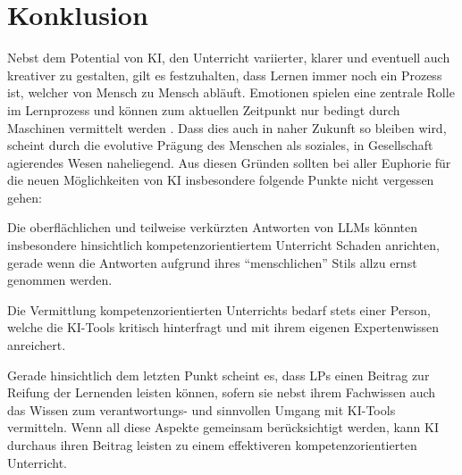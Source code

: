 \section{Konklusion}
Nebst dem Potential von \gls{KI}, den Unterricht variierter, klarer und eventuell auch kreativer zu gestalten, gilt es festzuhalten, dass Lernen immer noch ein Prozess ist, welcher von Mensch zu Mensch abläuft. Emotionen spielen eine zentrale Rolle im Lernprozess und können zum aktuellen Zeitpunkt nur bedingt durch Maschinen vermittelt werden \cite{nzzfolio}. Dass dies auch in naher Zukunft so bleiben wird, scheint durch die evolutive Prägung des Menschen als soziales, in Gesellschaft agierendes Wesen naheliegend. Aus diesen Gründen sollten bei aller Euphorie für die neuen Möglichkeiten von \gls{KI} insbesondere folgende Punkte nicht vergessen gehen: \begin{enumerate*}\item Die oberflächlichen und teilweise verkürzten Antworten von \glspl{LLM} könnten insbesondere hinsichtlich kompetenzorientiertem Unterricht Schaden anrichten, gerade wenn die Antworten aufgrund ihres ``menschlichen'' Stils allzu ernst genommen werden. \item Die Vermittlung kompetenzorientierten Unterrichts bedarf stets einer Person, welche die \gls{KI}-Tools kritisch hinterfragt und mit ihrem eigenen Expertenwissen anreichert.
\end{enumerate*} Gerade hinsichtlich dem letzten Punkt scheint es, dass \glspl{LP} einen Beitrag zur Reifung der Lernenden leisten können, sofern sie nebst ihrem Fachwissen auch das Wissen zum verantwortungs- und sinnvollen Umgang mit \gls{KI}-Tools vermitteln. Wenn all diese Aspekte gemeinsam berücksichtigt werden, kann \gls{KI} durchaus ihren Beitrag leisten zu einem effektiveren kompetenzorientierten Unterricht.

 
\printglossary

\printbibliography